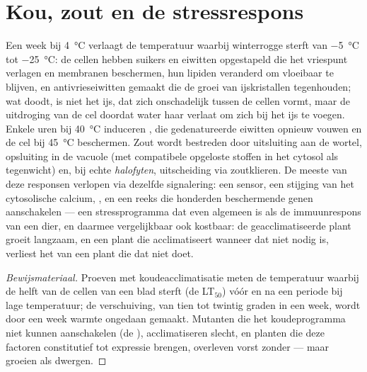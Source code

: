 \section{Kou, zout en de stressrespons}

\begin{proposition}\label{prop:b2:plant-plasticity:stress}
Een week bij \qty{4}{\celsius} verlaagt de temperatuur waarbij winterrogge
sterft van \qty{-5}{\celsius} tot \qty{-25}{\celsius}: de cellen hebben
suikers en eiwitten opgestapeld die het vriespunt verlagen en membranen
beschermen, hun lipiden veranderd om vloeibaar te blijven, en
antivrieseiwitten gemaakt die de groei van ijskristallen tegenhouden; wat
doodt, is niet het ijs, dat zich onschadelijk tussen de cellen vormt, maar
de uitdroging van de cel doordat water haar verlaat om zich bij het ijs te
voegen. Enkele uren bij \qty{40}{\celsius} induceren
\emph{}, die gedenatureerde eiwitten opnieuw vouwen en de
cel bij \qty{45}{\celsius} beschermen. Zout wordt bestreden door uitsluiting
aan de wortel, opsluiting in de vacuole (met compatibele opgeloste stoffen
in het cytosol als tegenwicht) en, bij echte \emph{halofyten}, uitscheiding
via zoutklieren. De meeste van deze responsen verlopen via dezelfde
signalering: een sensor, een stijging van het cytosolische calcium,
, en een reeks  die honderden beschermende
genen aanschakelen --- een stressprogramma dat even algemeen is als de
immuunrespons van een dier, en daarmee vergelijkbaar ook kostbaar: de
geacclimatiseerde plant groeit langzaam, en een plant die acclimatiseert
wanneer dat niet nodig is, verliest het van een plant die dat niet doet.
\end{proposition}
\begin{proof}[Bewijsmateriaal]
Proeven met koudeacclimatisatie meten de temperatuur waarbij de helft van
de cellen van een blad sterft (de LT$_{50}$) vóór en na een periode bij lage
temperatuur; de verschuiving, van tien tot twintig graden in een week, wordt
door een week warmte ongedaan gemaakt. Mutanten die het koudeprogramma niet
kunnen aanschakelen (de ), acclimatiseren slecht, en
planten die deze factoren constitutief tot expressie brengen, overleven
vorst zonder  --- maar groeien als dwergen.
\end{proof}

